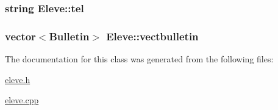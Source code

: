 \hypertarget{class_eleve_a4dbaefdec13d5feabd6c98eea3af84c1}{
\subsubsection[{tel}]{\setlength{\rightskip}{0pt plus 5cm}string Eleve\+::tel\hspace{0.3cm}{\ttfamily [private]}}}\label{class_eleve_a4dbaefdec13d5feabd6c98eea3af84c1}
\hypertarget{class_eleve_ac5a4dd1b22caf00a6b055184b10b734d}{
\subsubsection[{vectbulletin}]{\setlength{\rightskip}{0pt plus 5cm}vector$<${\bf Bulletin}$>$ Eleve\+::vectbulletin\hspace{0.3cm}{\ttfamily [private]}}}\label{class_eleve_ac5a4dd1b22caf00a6b055184b10b734d}


The documentation for this class was generated from the following files\+:\begin{DoxyCompactItemize}
\item 
\hyperlink{eleve_8h}{eleve.\+h}\item 
\hyperlink{eleve_8cpp}{eleve.\+cpp}\end{DoxyCompactItemize}
